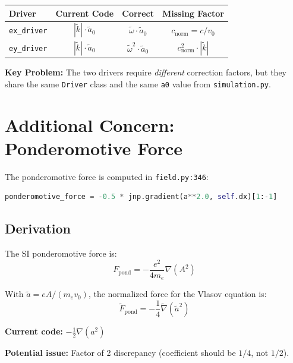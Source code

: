 \documentclass[11pt]{article}
\begin{document}
\begin{center}
\renewcommand{\arraystretch}{1.5}
\begin{tabular}{lccc}
\toprule
\textbf{Driver} & \textbf{Current Code} & \textbf{Correct} & \textbf{Missing Factor} \\
\midrule
\texttt{ex\_driver} & $|\tilde{k}| \cdot \tilde{a}_0$ & $\tilde{\omega} \cdot \tilde{a}_0$ & $c_{\text{norm}} = c/v_0$ \\[6pt]
\texttt{ey\_driver} & $|\tilde{k}| \cdot \tilde{a}_0$ & $\tilde{\omega}^2 \cdot \tilde{a}_0$ & $c_{\text{norm}}^2 \cdot |\tilde{k}|$ \\
\bottomrule
\end{tabular}
\end{center}

\begin{center}
\colorbox{yellow!30}{\parbox{0.9\textwidth}{
\textbf{Key Problem:} The two drivers require \emph{different} correction factors, but they share the same \texttt{Driver} class and the same \texttt{a0} value from \texttt{simulation.py}.
}}
\end{center}

\section{Additional Concern: Ponderomotive Force}

The ponderomotive force is computed in \texttt{field.py:346}:
\begin{lstlisting}[language=Python]
ponderomotive_force = -0.5 * jnp.gradient(a**2.0, self.dx)[1:-1]
\end{lstlisting}

\subsection{Derivation}
The SI ponderomotive force is:
\begin{equation}
    F_{\text{pond}} = -\frac{e^2}{4 m_e} \nabla(A^2)
\end{equation}

With $\tilde{a} = eA/(m_e v_0)$, the normalized force for the Vlasov equation is:
\begin{equation}
    \tilde{F}_{\text{pond}} = -\frac{1}{4} \tilde{\nabla}(\tilde{a}^2)
\end{equation}

\textbf{Current code:} $-\frac{1}{2} \nabla(a^2)$

\textbf{Potential issue:} Factor of 2 discrepancy (coefficient should be $1/4$, not $1/2$).
\end{document}
